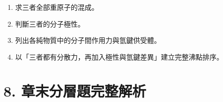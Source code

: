 \documentclass[11pt,a4paper]{article}
\providecommand{\tightlist}{%
  \setlength{\itemsep}{0pt}\setlength{\parskip}{0pt}}
\begin{document}
\begin{enumerate}
  \begin{enumerate}
  \def\labelenumii{\arabic{enumii}.}
  \tightlist
  \item
    求三者全部重原子的混成。
  \item
    判斷三者的分子極性。
  \item
    列出各純物質中的分子間作用力與氫鍵供受體。
  \item
    以「三者都有分散力，再加入極性與氫鍵差異」建立完整沸點排序。
  \end{enumerate}
\end{enumerate}

\section{8. 章末分層題完整解析}\label{ux7ae0ux672bux5206ux5c64ux984cux5b8cux6574ux89e3ux6790}
\end{document}
